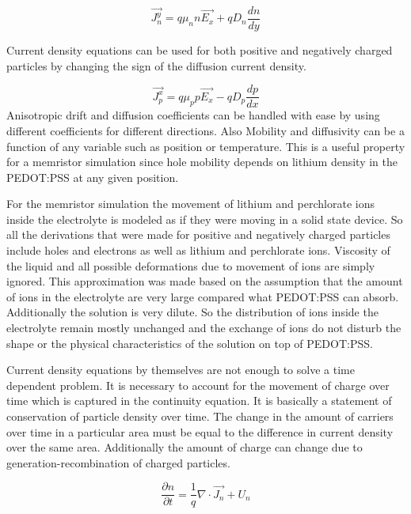 \begin{equation}
\vec{J_n^y}=q \mu_{n} n \vec{E_x}+qD_{n} \frac{dn}{dy} 
\end{equation}

Current density equations can be used for both positive and negatively charged particles by changing the sign of the diffusion current density.

\begin{equation}
\vec{J_p^x}=q \mu_{p} p \vec{E_x}-qD_{p} \frac{dp}{dx} 
\label{cdenp}
\end{equation}
Anisotropic drift and diffusion coefficients can be handled with ease by using different coefficients for different directions. Also Mobility and diffusivity can be a function of any variable such as position or temperature. This is a useful property for a memristor simulation since hole mobility depends on lithium density in the PEDOT:PSS at any given position. 

For the memristor simulation the movement of lithium and perchlorate ions inside the electrolyte is modeled as if they were moving in a solid state device. So all the derivations that were made for positive and negatively charged particles include holes and electrons as well as lithium and perchlorate ions. Viscosity of the liquid and all possible deformations due to movement of ions are simply ignored. This approximation was made based on the assumption that the amount of ions in the electrolyte are very large compared what PEDOT:PSS can absorb. Additionally the solution is very dilute. So the distribution of ions inside the electrolyte remain mostly unchanged and the exchange of ions do not disturb the shape or the physical characteristics of the solution on top of PEDOT:PSS.  

Current density equations by themselves are not enough to solve a time dependent problem. It is necessary to account for the movement of charge over time which is captured in the continuity equation. It is basically a statement of conservation of particle density over time. The change in the amount of carriers over time in a particular area must be equal to the difference in current density over the same area. Additionally the amount of charge can change due to generation-recombination of charged particles.


\begin{equation}
\frac{\partial n}{\partial t}=\frac{1}{q}\nabla \cdot \vec{J_n}+U_{n}
\label{conn}
\end{equation}

